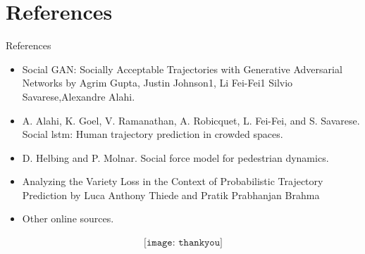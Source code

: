 \documentclass{beamer}
\begin{document}
\section{References}
\begin{frame}{References}
    \begin{itemize}
        \item Social GAN: Socially Acceptable Trajectories with Generative Adversarial Networks by Agrim Gupta, Justin Johnson1, Li Fei-Fei1 Silvio Savarese,Alexandre Alahi.
        \item A. Alahi, K. Goel, V. Ramanathan, A. Robicquet, L. Fei-Fei, and S. Savarese. Social lstm: Human trajectory prediction in crowded spaces. 
        \item D. Helbing and P. Molnar. Social force model for pedestrian dynamics. 
       \item Analyzing the Variety Loss in the Context of Probabilistic Trajectory Prediction by Luca Anthony Thiede and Pratik Prabhanjan Brahma
\item Other online sources.


    \end{itemize}
\end{frame}
\begin{frame}
\begin{align*}
    \texttt{[image: thankyou]}  
\end{align*}

\end{frame}
\end{document}
